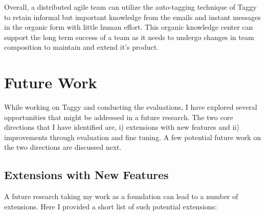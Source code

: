 Overall, a distributed agile team can utilize the auto-tagging technique of Taggy to retain informal but important knowledge from the emails and instant messages in the organic form with little human effort. This organic knowledge center can support the long term success of a team as it needs to undergo changes in team composition to maintain and extend it's product.

\section{Future Work}
While working on Taggy and conducting the evaluations, I have explored several opportunities that might be addressed in a future research. The two core directions that I have identified are, i) extensions with new features and ii) improvements through evaluation and fine tuning. A few potential future work on the two directions are discussed next.

\subsection{Extensions with New Features}
A future research taking my work as a foundation can lead to a number of extensions. Here I provided a short list of such potential extensions:

